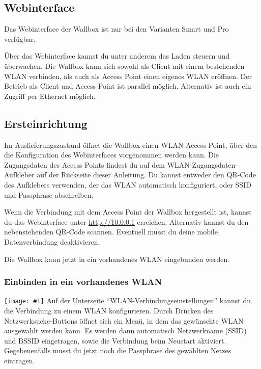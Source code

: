 \documentclass[a4paper,10pt]{article}
\newcommand{\gfx}[1]{\texttt{[image: \#1]}}
\begin{document}
\begin{multicols*}{2}
	\section{Webinterface}
	Das Webinterface der Wallbox ist nur bei den Varianten Smart und Pro verfügbar.

	\Blindtext %

	Über das Webinterface kannst du unter anderem das Laden steuern und überwachen.
	Die Wallbox kann sich sowohl als Client mit einem bestehenden WLAN verbinden,
	als auch als Access Point einen eigenes WLAN eröffnen. Der Betrieb als Client
	und Access Point ist parallel möglich. Alternativ ist auch ein Zugriff per
	Ethernet möglich.

	\subsection{Ersteinrichtung}
	Im Auslieferungszustand öffnet die Wallbox einen WLAN-Access-Point, über den
	die Konfiguration des Webinterfaces vorgenommen werden kann.
	Die Zugangsdaten des Access Points findest du auf dem WLAN-Zugangsdaten-Aufkleber
	auf der Rückseite dieser Anleitung. Du kannst entweder den QR-Code des Aufklebers verwenden,
	der das WLAN automatisch konfiguriert, oder SSID und Passphrase abschreiben.

	\begin{minipage}{0.35\textwidth}
		Wenn die Verbindung mit dem Access Point der Wallbox hergestellt ist, kannst du das Webinterface
		unter \url{http://10.0.0.1} erreichen. Alternativ kannst du den nebenstehenden QR-Code scannen.
		Eventuell musst du deine mobile Datenverbindung deaktivieren.
	\end{minipage}\hfill
	\begin{minipage}{0.12\textwidth}
		\begin{flushright}
		\end{flushright}
	\end{minipage}

	Die Wallbox kann jetzt in ein vorhandenes WLAN eingebunden werden.
	\subsubsection{Einbinden in ein vorhandenes WLAN}
	\gfx{./img_warp2/resized/web_wifi_sta}
	Auf der Unterseite \enquote{WLAN-Verbindungseinstellungen} kannst du die Verbindung zu einem WLAN konfigurieren.
	Durch Drücken des Netzwerksuche-Buttons öffnet sich ein Menü, in dem das gewünschte WLAN ausgewählt werden kann.
	Es werden dann automatisch Netzwerkname (SSID) und BSSID eingetragen, sowie die Verbindung beim Neustart aktiviert.
	Gegebenenfalls musst du jetzt noch die Passphrase des gewählten Netzes eintragen.


\end{multicols*}
\end{document}
